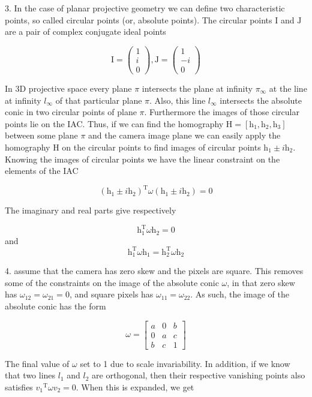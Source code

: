 \documentclass[conference]{IEEEtran}
\begin{document}
3. In the case of planar projective geometry we can define two characteristic points, so called circular points (or, absolute points). The circular points \( \mathrm{I} \) and \( \mathrm{J} \) are a pair of complex conjugate ideal points

\[ \mathrm{I} = \begin{pmatrix} 1\\i\\0 \end{pmatrix}, 
\mathrm{J} = \begin{pmatrix} 1\\-i\\0 \end{pmatrix} \]

In 3D projective space every plane \( \pi \) intersects the plane at infinity \( \pi_\infty \) at the line at infinity \( l_\infty \) of that particular plane \( \pi \). Also, this line \( l_\infty \) intersects the absolute conic in two circular points of plane \( \pi \). Furthermore the images of those circular points lie on the IAC. Thus, if we can find the homography \( \mathrm{H} = [\mathrm{h}_1, \mathrm{h}_2, \mathrm{h}_3] \) between some plane \( \pi \) and the camera image plane we can easily apply the homography H on the circular points to find images of circular points \( \mathrm{h}_1 \pm i\mathrm{h}_2\). Knowing the images of circular points we have the linear constraint on the elements of the IAC

\[ (\mathrm{h}_1 \pm i\mathrm{h}_2)^\mathrm{T}\omega(\mathrm{h}_1 \pm i\mathrm{h}_2) = 0  \]

The imaginary and real parts give respectively 

\[ \mathrm{h}_1^\mathrm{T}\omega\mathrm{h}_2 = 0 \] and 
\[ \mathrm{h}_1^\mathrm{T}\omega\mathrm{h}_1 = \mathrm{h}_2^\mathrm{T}\omega\mathrm{h}_2 \]

4. assume that the camera has zero skew and the pixels are square. This removes some of the constraints on the image of the absolute conic \( \omega \), in that zero skew has \( \omega_{12} = \omega_{21} = 0\), and square pixels has \( \omega_{11} = \omega_{22} \). As such, the image of the absolute conic has the form

\[ \omega = \begin{bmatrix}
a & 0 & b  \\
0 & a & c  \\
b & c & 1 
\end{bmatrix}\] 

The final value of \( \omega \) set to 1 due to scale invariability.  In addition, if we know that two lines \( l_1 \) and \( l_2 \) are orthogonal, then their respective vanishing points also satisfies \( {v_1}^\mathrm{T}\omega{v_2} = 0 \). When this is expanded, we get
\end{document}

